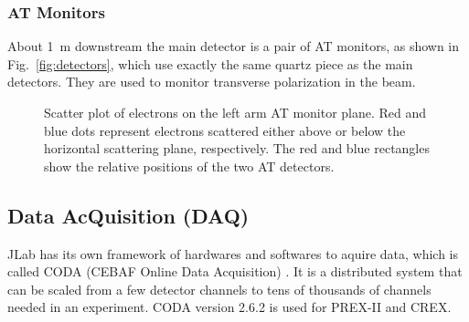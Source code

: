 \subsubsection{AT Monitors}
About 1~m downstream the main detector is a pair of AT monitors, as shown 
in Fig.~\ref{fig:detectors}, which use exactly the same quartz piece as the 
main detectors. They are used to monitor transverse polarization in the beam.
\begin{figure}[!h]
    \centering
    \caption[Scatter plot of electrons on the left arm AT monitor plane.]
    {Scatter plot of electrons on the left arm AT monitor plane. 
    Red and blue dots represent electrons scattered either above or below the
    horizontal scattering plane, respectively. The red and blue rectangles
    show the relative positions of the two AT detectors. 
    }
\end{figure}

\subsection{Data AcQuisition (DAQ)}
JLab has its own framework of hardwares and softwares to aquire data, which
is called CODA (CEBAF Online Data Acquisition) \cite{CODA}. It is a distributed
system that can be scaled from a few detector channels to tens of thousands of
channels needed in an experiment. CODA version 2.6.2 is used for PREX-II and CREX.

